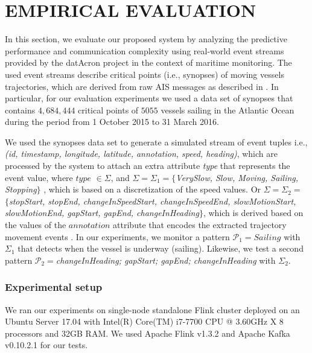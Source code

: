 \section{EMPIRICAL EVALUATION}
\label{sec:results}
In this section, we evaluate our proposed system by analyzing the predictive performance and communication complexity  using real-world event streams provided by the datAcron project in the context of maritime monitoring. The used event streams describe critical points (i.e., synopses) of moving vessels trajectories, which are derived from raw AIS messages as described in \cite{synopses1}. In particular, for our evaluation experiments we used a data set of synopses that contains $4,684,444$ critical points of $5055$ vessels sailing in the Atlantic Ocean during the period from 1 October 2015 to 31 March 2016.

\par We used the synopses data set to generate a simulated stream of event tuples  i.e., \textit{(id, timestamp, longitude, latitude, annotation, speed, heading)}, which are processed by the system to attach an extra attribute \textit{type} that represents the event value,  where $type$ $\in \Sigma$,  and $ \Sigma= \Sigma_1=$$\{$\textit{VerySlow, Slow, Moving,  Sailing, Stopping}$\}$ , which is based on a discretization of the speed values. Or $\Sigma=\Sigma_2=$ $\{$\textit{stopStart, stopEnd, changeInSpeedStart, changeInSpeedEnd,  slowMotionStart, slowMotionEnd, gapStart, gapEnd, changeInHeading}$\}$, which is derived based on the values of the $annotation$ attribute that encodes the extracted trajectory movement events \cite{synopses1}. In our experiments, we monitor a pattern $\mathcal{P}_1=Sailing$ with $\Sigma_1$ that detects when the vessel is underway (sailing). Likewise, we test a second pattern  $\mathcal{P}_2=$\textit{changeInHeading; gapStart; gapEnd; changeInHeading} with $\Sigma_2$.


\subsubsection*{Experimental setup} We ran our experiments on single-node standalone Flink cluster deployed on an Ubuntu Server 17.04 with Intel(R) Core(TM) i7-7700 CPU @ 3.60GHz X 8 processors and 32GB RAM. We used Apache Flink v1.3.2 and Apache Kafka v0.10.2.1 for our tests.


